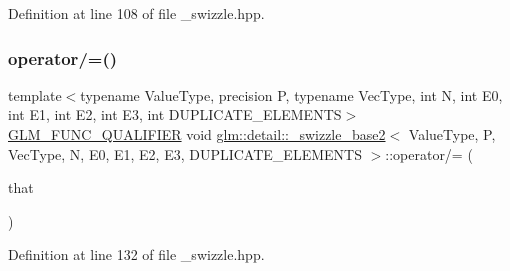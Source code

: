 Definition at line 108 of file \+\_\+swizzle.\+hpp.

\mbox{\label{structglm_1_1detail_1_1__swizzle__base2_a0a3e5ef1cb68f78a7e1bcd72f6e2dc4c}} 
\subsubsection{\texorpdfstring{operator/=()}{operator/=()}}
{\footnotesize\ttfamily template$<$typename Value\+Type, precision P, typename Vec\+Type, int N, int E0, int E1, int E2, int E3, int D\+U\+P\+L\+I\+C\+A\+T\+E\+\_\+\+E\+L\+E\+M\+E\+N\+TS$>$ \\
\hyperlink{setup_8hpp_a33fdea6f91c5f834105f7415e2a64407}{G\+L\+M\+\_\+\+F\+U\+N\+C\+\_\+\+Q\+U\+A\+L\+I\+F\+I\+ER} void \hyperlink{structglm_1_1detail_1_1__swizzle__base2}{glm\+::detail\+::\+\_\+swizzle\+\_\+base2}$<$ Value\+Type, P, Vec\+Type, N, E0, E1, E2, E3, D\+U\+P\+L\+I\+C\+A\+T\+E\+\_\+\+E\+L\+E\+M\+E\+N\+TS $>$\+::operator/= (\begin{DoxyParamCaption}\item[{const Vec\+Type \&}]{that }\end{DoxyParamCaption})\hspace{0.3cm}{\ttfamily [inline]}}



Definition at line 132 of file \+\_\+swizzle.\+hpp.

\mbox{\label{structglm_1_1detail_1_1__swizzle__base2_a70442376cb261474e23090737deff976}} 
